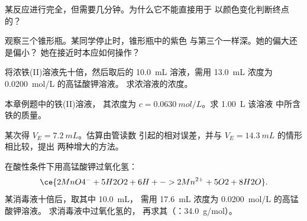 \begin{exercise}[$\star\star$]\label{exo:g11:titration:8}
某反应进行完全，但需要几分钟。为什么它不能直接用于
以颜色变化判断终点的？
\end{exercise}

\begin{exercise}[$\star\star$]\label{exo:g11:titration:9}
观察三个锥形瓶。某同学停止时，锥形瓶中的紫色
与第三个一样深。她的偏大还是偏小？
她在接近时本应如何操作？
\end{exercise}

\begin{exercise}[$\star\star$]\label{exo:g11:titration:10}
将浓铁(II)溶液先十倍，然后取后的
\qty{10.0}{mL} 溶液，需用 \qty{13.0}{mL} 浓度为
\qty{0.0200}{mol/L} 的高锰酸钾溶液。
求浓溶液的浓度。
\end{exercise}

\begin{exercise}[$\star\star$]\label{exo:g11:titration:11}
本章例题中的铁(II)溶液，
其浓度为 $c = \qty{0.0630}{mol/L}$。求 \qty{1.00}{L} 该溶液
中所含铁的质量。
\end{exercise}

\begin{exercise}[$\star\star\star$]\label{exo:g11:titration:12}
某次得 $V_E = \qty{7.2}{mL}$。估算由管读数
引起的相对误差，并与 $V_E = \qty{14.3}{mL}$ 的情形相比较，提出
两种增大的方法。
\end{exercise}

\begin{exercise}[$\star\star\star$]\label{exo:g11:titration:13}
在酸性条件下用高锰酸钾过氧化氢：
\[
  \ce{2MnO4^- + 5H2O2 + 6H+ -> 2Mn^{2+} + 5O2 + 8H2O} .
\]
某消毒液十倍后，取其中 \qty{10.0}{mL}，
需用 \qty{17.6}{mL} 浓度为 \qty{0.0200}{mol/L} 的高锰酸钾溶液。
求消毒液中过氧化氢的，
再求其（：\qty{34.0}{g/mol}）。
\end{exercise}

